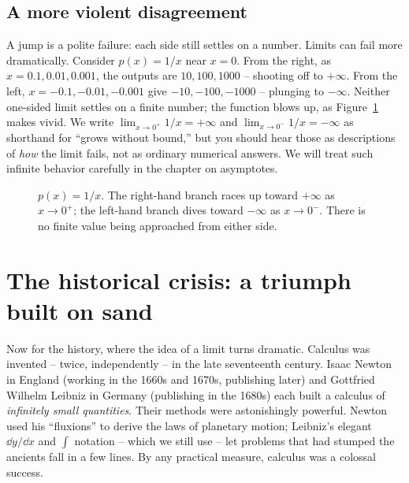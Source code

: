 \subsection{A more violent disagreement}

A jump is a polite failure: each side still settles on a number. Limits can fail more
dramatically. Consider $p(x) = 1/x$ near $x = 0$. From the right, as $x = 0.1, 0.01, 0.001$, the
outputs are $10, 100, 1000$ -- shooting off to $+\infty$. From the left, $x = -0.1, -0.01,
-0.001$ give $-10, -100, -1000$ -- plunging to $-\infty$. Neither one-sided limit settles on a
finite number; the function blows up, as Figure~\ref{ch05:reciprocal} makes vivid. We write
$\lim_{x\to 0^+} 1/x = +\infty$ and $\lim_{x\to 0^-} 1/x = -\infty$ as shorthand for ``grows
without bound,'' but you should hear those as descriptions of \emph{how} the limit fails, not as
ordinary numerical answers. We will treat such infinite behavior carefully in the chapter on
asymptotes.

\begin{figure}[H]
\centering
{}
\caption{$p(x)=1/x$. The right-hand branch races up toward $+\infty$ as $x\to 0^+$; the
left-hand branch dives toward $-\infty$ as $x\to 0^-$. There is no finite value being
approached from either side.}
\label{ch05:reciprocal}
\end{figure}

\section{The historical crisis: a triumph built on sand}

Now for the history, where the idea of a limit turns dramatic. Calculus
was invented -- twice, independently -- in the late seventeenth century. Isaac Newton in England
(working in the 1660s and 1670s, publishing later) and Gottfried Wilhelm Leibniz in Germany
(publishing in the 1680s) each built a calculus of \emph{infinitely small quantities}. Their
methods were astonishingly powerful. Newton used his ``fluxions'' to derive the laws of
planetary motion; Leibniz's elegant $\dd y/\dd x$ and $\int$ notation -- which we still use --
let problems that had stumped the ancients fall in a few lines. By any practical measure,
calculus was a colossal success.


